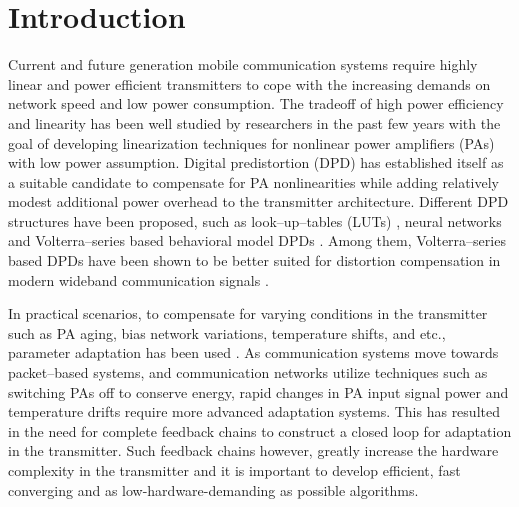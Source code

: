 \documentclass[journal]{IEEEtran}
\begin{document}
\section{Introduction}
Current and future generation mobile communication systems require highly linear and power efficient transmitters to cope with the increasing demands on network speed and low power consumption. The tradeoff of high power efficiency and linearity has been well studied by researchers in the past few years with the goal of developing linearization techniques for nonlinear power amplifiers (PAs) with low power assumption. Digital predistortion (DPD) has established itself as a suitable candidate to compensate for PA nonlinearities while adding relatively modest additional power overhead to the transmitter architecture. Different DPD structures have been proposed, such as look--up--tables (LUTs) \cite{cavers1990,hammi07}, neural networks \cite{benvenuto93,ibnkahla2000} and Volterra--series based behavioral model DPDs \cite{pedro,isaksson,soltani}. Among them, Volterra--series based DPDs have been shown to be better suited for distortion compensation in modern wideband communication signals \cite{liu}.

In practical scenarios, to compensate for varying conditions in the transmitter such as PA aging, bias network variations, temperature shifts, and etc., parameter adaptation has been used \cite{cavers1990}. As communication systems move towards packet--based systems, and communication networks utilize techniques such as switching PAs off to conserve energy, rapid changes in PA input signal power and temperature drifts require more advanced adaptation systems. This has resulted in the need for complete feedback chains to construct a closed loop for adaptation in the transmitter. Such feedback chains however, greatly increase the hardware complexity in the transmitter and it is important to develop efficient, fast converging and as low-hardware-demanding as possible algorithms.
\end{document}
